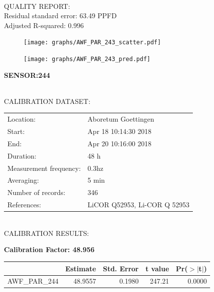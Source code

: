 \documentclass[oneside]{report}
\begin{document}
\hrulefill\\
QUALITY REPORT:\\
Residual standard error: 63.49 PPFD\\
Adjusted R-squared: 0.996



\begin{figure}[H]
  \centering
  \texttt{[image: graphs/AWF\_PAR\_243\_scatter.pdf]}
\end{figure}




\begin{figure}[H]
  \centering
  \texttt{[image: graphs/AWF\_PAR\_243\_pred.pdf]}
\end{figure}

\pagebreak


\begin{center}
\large{\textbf{SENSOR:244}}\\
\end{center}

\hrulefill\\
CALIBRATION DATASET:\\
\begin{table}[h!]
  \centering
  \label{tab:table1}
  \begin{tabular}{ll}
    Location: & Aboretum Goettingen\\ 
    
    
    Start:  & Apr 18 10:14:30 2018 \\
    End:   & Apr 20 10:16:00 2018\\ 
    Duration: & 48 h\\
    Measurement frequency: & 0.3hz\\
    Averaging:  &5 min\\
    Number of records: & 346 \\
    References: & LiCOR Q52953, Li-COR Q 52953 \\
  \end{tabular}
\end{table}

\hrulefill\\
CALIBRATION RESULTS:\\


\begin{center}
\textbf{\large{Calibration Factor: 48.956}}\\
\end{center}
\begin{table}[ht]
\centering
\begin{tabular}{rrrrr}
  \hline
 & Estimate & Std. Error & t value & Pr($>$$|$t$|$) \\ 
  \hline
AWF\_PAR\_244 & 48.9557 & 0.1980 & 247.21 & 0.0000 \\ 
   \hline
\end{tabular}
\end{table}
\end{document}
